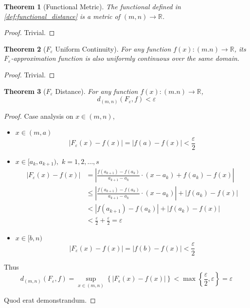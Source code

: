 \documentclass{article}
\DeclarePairedDelimiter\floor{\lfloor}{\rfloor}
\newtheorem{theorem}{Theorem}
\begin{document}
\begin{theorem}[Functional Metric]
The functional defined in \ref{def:functional_distance} is a metric of $(m,n)\to\mathbb{R}$.
\end{theorem}
\begin{proof}
Trivial.
\end{proof}

\begin{theorem}[$F_\varepsilon$ Uniform Continuity]
For any function $f(x):(m.n)\to\mathbb{R}$, its $F_\varepsilon$-approximation function is also uniformly continuous over the same domain.
\end{theorem}
\begin{proof}
Trivial.
\end{proof}

\begin{theorem}[$F_\varepsilon$ Distance]
For any function $f(x):(m.n)\to\mathbb{R}$,
\[
d_{(m,n)}(F_\varepsilon,f)<\varepsilon
\]
\end{theorem}
\begin{proof}
Case analysis on $x\in(m,n)$,
\begin{itemize}
\item
$x\in(m,a)$\\
\[
\left|F_\varepsilon(x)-f(x)\right|=\left|f(a)-f(x)\right|<\frac{\varepsilon}{2}
\]
\item
$x\in[a_k,a_{k+1}),\,\,k=1,2,\dots,s$
\begin{align*}
\left|F_\varepsilon(x)-f(x)\right|&=\left|\frac{f(a_{k+1})-f(a_k)}{a_{k+1}-a_k}\cdot(x-a_k)+f(a_k)-f(x)\right|\\
&\leq\left|\frac{f(a_{k+1})-f(a_k)}{a_{k+1}-a_k}\cdot(x-a_k)\right|+\left|f(a_k)-f(x)\right|\\
&<%
\left|f\left(a_{k+1}\right)-f\left(a_k\right)\right|+\left|f\left(a_k\right)-f\left(x\right)\right|\\
&<\frac{\varepsilon}{2}+\frac{\varepsilon}{2}=\varepsilon
\end{align*}
\item
$x\in[b,n)$\\
\[
\left|F_\varepsilon(x)-f(x)\right|=\left|f(b)-f(x)\right|<\frac{\varepsilon}{2}
\]
\end{itemize}
Thus
\[
d_{(m,n)}(F_\varepsilon,f)=\sup_{x\in(m,n)}\left\{\left|F_\epsilon(x)-f(x)\right|\right\}<\max\left\{\frac{\varepsilon}{2},\varepsilon\right\}=\varepsilon %
\]

Quod erat demonstrandum.
\end{proof}
\end{document}
